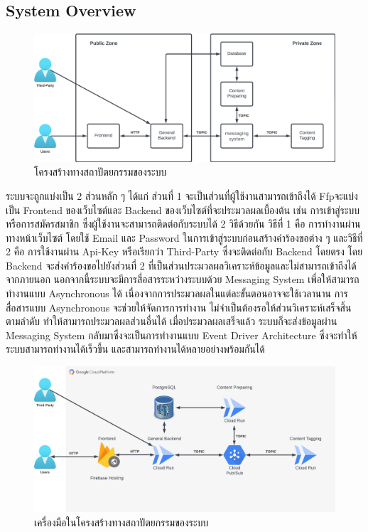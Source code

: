\documentclass[12pt,oneside,openright,a4paper]{cpe-thai-project}
\begin{document}
\subsection{System Overview}
  \begin{figure}[!ht]\centering
    \includegraphics[width=\textwidth]{./img/architechture_simple.png}
    \caption{โครงสร้างทางสถาปัตยกรรมของระบบ}\label{fig:architecture_simple} 
  \end{figure}
  \newpage
  \hspace{1cm}ระบบจะถูกแบ่งเป็น 2 ส่วนหลัก ๆ ได้แก่ ส่วนที่ 1 จะเป็นส่วนที่ผู้ใช้งานสามารถเข้าถึงได้ 
  Ffpจะแบ่งเป็น Frontend ของเว็บไซต์และ Backend ของเว็บไซต์ที่จะประมวลผลเบื้องต้น เช่น การเข้าสู่ระบบหรือการสมัครสมาชิก 
  ซึ่งผู้ใช้งานจะสามารถติดต่อกับระบบได้ 2 วิธีด้วยกัน วิธีที่ 1 คือ การทำงานผ่านทางหน้าเว็บไซต์ โดยใช้ Email และ Password ในการเข้าสู่ระบบก่อนสร้างคำร้องขอต่าง ๆ 
  และวิธีที่ 2 คือ การใช้งานผ่าน Api-Key หรือเรียกว่า Third-Party ซึ่งจะติดต่อกับ Backend โดยตรง 
  โดย Backend จะส่งคำร้องขอไปยังส่วนที่ 2 ที่เป็นส่วนประมวลผลวิเคราะห์ข้อมูลและไม่สามารถเข้าถึงได้จากภายนอก 
  นอกจากนี้ระบบจะมีการสื่อสารระหว่างระบบด้วย Messaging System เพื่อให้สามารถทำงานแบบ Asynchronous ได้ 
  เนื่องจากการประมวลผลในแต่ละขั้นตอนอาจจะใช้เวลานาน การสื่อสารแบบ Asynchronous จะช่วยให้จัดการการทำงาน ไม่จำเป็นต้องรอให้ส่วนวิเคราะห์เสร็จสิ้นตามลำดับ 
  ทำให้สามารถประมวลผลส่วนอื่นได้ เมื่อประมวลผลเสร็จแล้ว ระบบก็จะส่งข้อมูลผ่าน Messaging System กลับมาซึ่งจะเป็นการทำงานแบบ Event Driver Architecture
  ซึ่งจะทำให้ระบบสามารถทำงานได้เร็วขึ้น และสามารถทำงานได้หลายอย่างพร้อมกันได้
  \begin{figure}[!ht]\centering
    \includegraphics[width=\textwidth]{./img/architechture.png}
    \caption{เครื่องมือในโครงสร้างทางสถาปัตยกรรมของระบบ}\label{fig:architecture} 
  \end{figure}
  
\end{document}

